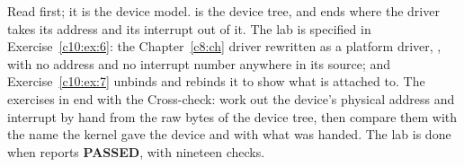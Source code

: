 Read  first; it is the device model.  is the device tree, and
ends where the driver takes its address and its interrupt out of it. The lab is specified in
Exercise~\ref{c10:ex:6}: the Chapter~\ref{c8:ch} driver rewritten as a platform driver,
, with no address and no interrupt number anywhere in its source; and
Exercise~\ref{c10:ex:7} unbinds and rebinds it to show what  is attached to. The
exercises in  end with the Cross-check: work out the device's physical
address and interrupt by hand from the raw bytes of the device tree, then compare them with the
name the kernel gave the device and with what  was handed. The lab is done when
 reports \textbf{PASSED}, with nineteen checks.





